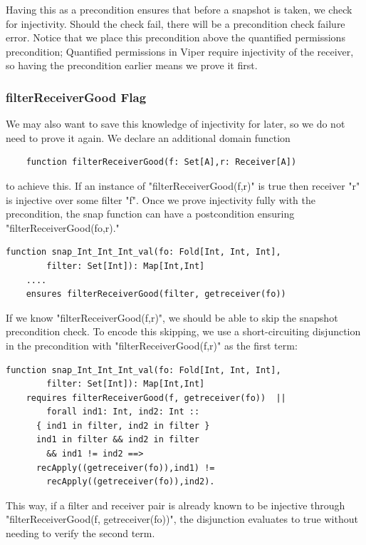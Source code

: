 \documentclass[msc,oneside]{ubcthesis}
\theoremstyle{definition}
\begin{document}
Having this as a precondition ensures that before a snapshot is taken, we check for injectivity. Should the check fail, there will be a precondition check failure error. Notice that we place this precondition above the quantified permissions precondition; Quantified permissions in Viper require injectivity of the receiver, so having the precondition earlier means we prove it first.

\subsubsection{filterReceiverGood Flag}
We may also want to save this knowledge of injectivity for later, so we do not need to prove it again. We declare an additional domain function 
\begin{lstlisting}
    function filterReceiverGood(f: Set[A],r: Receiver[A])
\end{lstlisting}
to achieve this. If an instance of "filterReceiverGood(f,r)" is true then receiver "r" is injective over some filter "f". Once we prove injectivity fully with the precondition, the snap function can have a postcondition ensuring "filterReceiverGood(fo,r)."
\begin{lstlisting}
function snap_Int_Int_Int_val(fo: Fold[Int, Int, Int], 
        filter: Set[Int]): Map[Int,Int]
    ....
    ensures filterReceiverGood(filter, getreceiver(fo))
\end{lstlisting}

If we know "filterReceiverGood(f,r)", we should be able to skip the snapshot precondition check. To encode this skipping, we use a short-circuiting disjunction in the precondition with "filterReceiverGood(f,r)" as the first term:
\begin{lstlisting}
function snap_Int_Int_Int_val(fo: Fold[Int, Int, Int], 
        filter: Set[Int]): Map[Int,Int]
    requires filterReceiverGood(f, getreceiver(fo))  ||     
        forall ind1: Int, ind2: Int ::
      { ind1 in filter, ind2 in filter }
      ind1 in filter && ind2 in filter 
        && ind1 != ind2 ==>
      recApply((getreceiver(fo)),ind1) !=
        recApply((getreceiver(fo)),ind2).
\end{lstlisting}
This way, if a filter and receiver pair is already known to be injective through "filterReceiverGood(f, getreceiver(fo))", the disjunction evaluates to true without needing to verify the second term.
\end{document}
